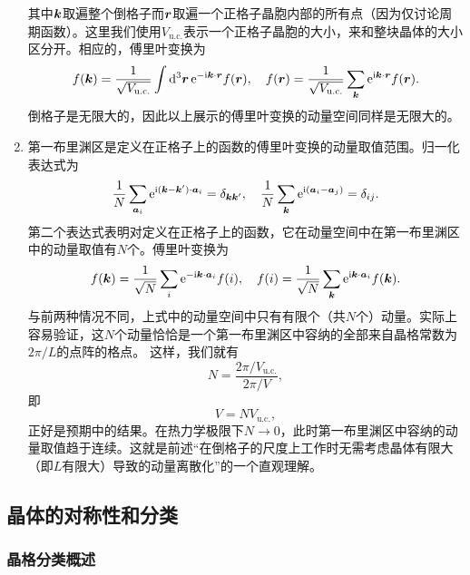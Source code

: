 \documentclass[hyperref, UTF8, a4paper]{ctexart}
\newcommand*{\ii}{\mathrm{i}}
\newcommand*{\ee}{\mathrm{e}}
\begin{document}
\begin{enumerate}
    其中$\vb*{k}$取遍整个倒格子而$\vb*{r}$取遍一个正格子晶胞内部的所有点（因为仅讨论周期函数）。这里我们使用$V_\text{u.c.}$表示一个正格子晶胞的大小，来和整块晶体的大小区分开。相应的，傅里叶变换为
    \begin{equation}
        f(\vb*{k}) = \frac{1}{\sqrt{V_\text{u.c.}}} \int \dd[3]{\vb*{r}} \ee^{- \ii \vb*{k} \cdot \vb*{r}} f(\vb*{r}), \quad f(\vb*{r}) = \frac{1}{\sqrt{V_\text{u.c.}}} \sum_{\vb*{k}} \ee^{\ii \vb*{k} \cdot \vb*{r}} f(\vb*{r}).
    \end{equation}
    倒格子是无限大的，因此以上展示的傅里叶变换的动量空间同样是无限大的。
    \item 第一布里渊区是定义在正格子上的函数的傅里叶变换的动量取值范围。归一化表达式为
    \begin{equation}
        \frac{1}{N} \sum_{\vb*{a}_i} \ee^{\ii (\vb*{k} - \vb*{k}') \cdot \vb*{a}_i} = \delta_{\vb*{k} \vb*{k}'}, \quad \frac{1}{N} \sum_{\vb*{k}} \ee^{\ii (\vb*{a}_i - \vb*{a}_j)} = \delta_{ij}.
    \end{equation}
    第二个表达式表明对定义在正格子上的函数，它在动量空间中在第一布里渊区中的动量取值有$N$个。傅里叶变换为
    \begin{equation}
        f(\vb*{k}) = \frac{1}{\sqrt{N}} \sum_{i} \ee^{- \ii \vb*{k} \cdot \vb*{a}_i} f(i), \quad f(i) = \frac{1}{\sqrt{N}} \sum_{\vb*{k}} \ee^{\ii \vb*{k} \cdot \vb*{a}_i} f(\vb*{k}).
    \end{equation}
    与前两种情况不同，上式中的动量空间中只有有限个（共$N$个）动量。实际上容易验证，这$N$个动量恰恰是一个第一布里渊区中容纳的全部来自晶格常数为$2\pi / L$的点阵的格点。
    这样，我们就有
    \[
        N = \frac{2\pi / V_\text{u.c.}}{2\pi / V},
    \]
    即
    \begin{equation}
        V = N V_\text{u.c.},
    \end{equation}
    正好是预期中的结果。在热力学极限下$N \to 0$，此时第一布里渊区中容纳的动量取值趋于连续。这就是前述“在倒格子的尺度上工作时无需考虑晶体有限大（即$L$有限大）导致的动量离散化”的一个直观理解。
\end{enumerate}

\subsection{晶体的对称性和分类}

\subsubsection{晶格分类概述}
\end{document}

